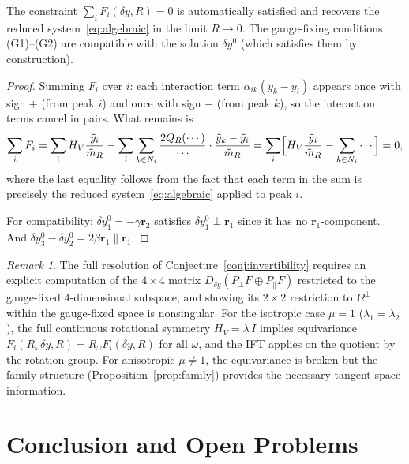 \documentclass[11pt]{article}
\theoremstyle{plain}%
\theoremstyle{definition}%
\theoremstyle{definition}%
\theoremstyle{remark}%
\newtheorem{rmk}[thm]{Remark}%
\numberwithin{equation}{section}
\newcommand{\HV}{H_V}
\begin{document}
\begin{prop}\label{prop:sum-Fi}
The constraint $\sum_i F_i(\delta y,R)=0$ is automatically satisfied and recovers the reduced system~\eqref{eq:algebraic} in the limit $R\to 0$. The gauge-fixing conditions (G1)--(G2) are compatible with the solution $\delta y^0$ (which satisfies them by construction).
\end{prop}

\begin{proof}
Summing $F_i$ over $i$: each interaction term $\alpha_{ik}(y_k-y_i)$ appears once with sign $+$ (from peak $i$) and once with sign $-$ (from peak $k$), so the interaction terms cancel in pairs. What remains is
\[
\sum_i F_i = \sum_i \HV\frac{\tilde{y}_i}{\tilde{m}_R} - \sum_i\sum_{k\in N_i}\frac{2Q_R(\cdots)}{\cdots}\cdot\frac{\tilde{y}_k-\tilde{y}_i}{\tilde{m}_R} = \sum_i\Bigl[\HV\frac{\tilde{y}_i}{\tilde{m}_R} - \sum_{k\in N_i}\cdots\Bigr] = 0,
\]
where the last equality follows from the fact that each term in the sum is precisely the reduced system~\eqref{eq:algebraic} applied to peak $i$.

For compatibility: $\delta y_1^0=-\gamma\boldsymbol{r}_2$ satisfies $\delta y_1^0\perp\boldsymbol{r}_1$ since it has no $\boldsymbol{r}_1$-component. And $\delta y_3^0-\delta y_2^0=2\beta\boldsymbol{r}_1\parallel\boldsymbol{r}_1$.
\end{proof}

\begin{rmk}
The full resolution of Conjecture~\ref{conj:invertibility} requires an explicit computation of the $4\times 4$ matrix $D_{\delta y}(P_\perp F\oplus P_\parallel F)$ restricted to the gauge-fixed 4-dimensional subspace, and showing its $2\times 2$ restriction to $\Omega^\perp$ within the gauge-fixed space is nonsingular. For the isotropic case $\mu=1$ ($\lambda_1=\lambda_2$), the full continuous rotational symmetry $\HV=\lambda\,I$ implies equivariance $F_i(R_\omega\delta y,R)=R_\omega F_i(\delta y,R)$ for all $\omega$, and the IFT applies on the quotient by the rotation group. For anisotropic $\mu\neq 1$, the equivariance is broken but the family structure (Proposition~\ref{prop:family}) provides the necessary tangent-space information.
\end{rmk}


\section{Conclusion and Open Problems}\label{sec:conclusion}
\end{document}
